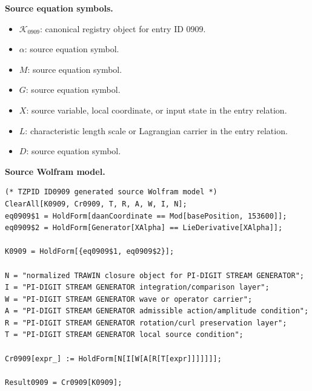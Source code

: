 \begin{minipage}[t]{0.49\linewidth}
\begingroup
\small
\raggedright
\textbf{Source equation symbols.}\par
\begin{itemize}[leftmargin=1.35em,itemsep=1pt,topsep=1pt,parsep=0pt]
    \item $\mathcal{K}_{0909}$: canonical registry object for entry ID 0909.
    \item $\alpha$: source equation symbol.
    \item $M$: source equation symbol.
    \item $G$: source equation symbol.
    \item $X$: source variable, local coordinate, or input state in the entry relation.
    \item $L$: characteristic length scale or Lagrangian carrier in the entry relation.
    \item $D$: source equation symbol.
\end{itemize}
\endgroup
\end{minipage}\hfill
\begin{minipage}[t]{0.47\linewidth}
\begingroup
\scriptsize
\raggedright
\textbf{Source Wolfram model.}\par
\begin{Verbatim}[fontsize=\tiny,breaklines=true,breakanywhere=true]
(* TZPID ID0909 generated source Wolfram model *)
ClearAll[K0909, Cr0909, T, R, A, W, I, N];
eq0909$1 = HoldForm[daanCoordinate == Mod[basePosition, 153600]];
eq0909$2 = HoldForm[Generator[XAlpha] == LieDerivative[XAlpha]];

K0909 = HoldForm[{eq0909$1, eq0909$2}];

N = "normalized TRAWIN closure object for PI-DIGIT STREAM GENERATOR";
I = "PI-DIGIT STREAM GENERATOR integration/comparison layer";
W = "PI-DIGIT STREAM GENERATOR wave or operator carrier";
A = "PI-DIGIT STREAM GENERATOR admissible action/amplitude condition";
R = "PI-DIGIT STREAM GENERATOR rotation/curl preservation layer";
T = "PI-DIGIT STREAM GENERATOR local source condition";

Cr0909[expr_] := HoldForm[N[I[W[A[R[T[expr]]]]]]];

Result0909 = Cr0909[K0909];
\end{Verbatim}
\endgroup
\end{minipage}

